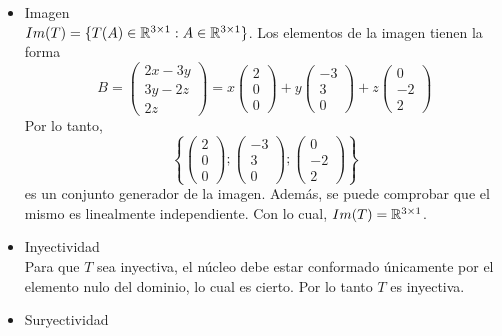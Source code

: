 \begin{mdframed}[style=s]
\begin{enumerate}
\begin{itemize}
                    \item Imagen\\
                        $Im(T)=\{T(A)\in\mathbb{R}^{3\times1}:A\in\mathbb{R}^{3\times1}\}$. Los elementos de la imagen tienen la forma\[B=\begin{pmatrix}
                            2x-3y\\3y-2z\\2z
                        \end{pmatrix}=x\begin{pmatrix}
                            2\\0\\0
                        \end{pmatrix}+y\begin{pmatrix}
                            -3\\3\\0
                        \end{pmatrix}+z\begin{pmatrix}
                            0\\-2\\2
                        \end{pmatrix}\]
                        Por lo tanto, \[\left\{\begin{pmatrix}
                            2\\0\\0
                        \end{pmatrix};\begin{pmatrix}
                            -3\\3\\0
                        \end{pmatrix};\begin{pmatrix}
                            0\\-2\\2
                        \end{pmatrix}\right\}\]
                        es un conjunto generador de la imagen. Además, se puede comprobar que el mismo es linealmente independiente. Con lo cual, $Im(T)=\mathbb{R}^{3\times1}$.
                    \item Inyectividad\\
                        Para que $T$ sea inyectiva, el núcleo debe estar conformado únicamente por el elemento nulo del dominio, lo cual es cierto. Por lo tanto $T$ es inyectiva.
                    \item Suryectividad\\

\end{itemize}
\end{enumerate}
\end{mdframed}

